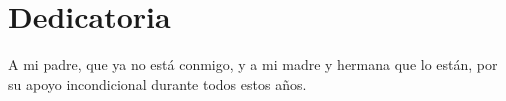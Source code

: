 
\chapter*{Dedicatoria}

A mi padre, que ya no está conmigo, y a mi madre y hermana que lo están, por su apoyo incondicional durante todos estos años.

